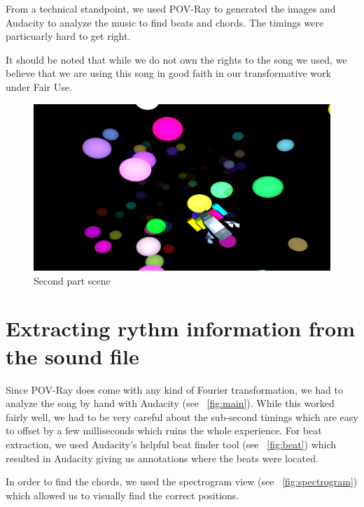 \documentclass[a4paper, 12pt]{scrartcl}
\begin{document}
    From a technical standpoint, we used POV-Ray to generated the images and Audacity to analyze
    the music to find beats and chords. The timings were particuarly hard to get right.

    It should be noted that while we do not own the rights to the song we used, we believe that we
    are using this song in good faith in our transformative work under Fair Use.

    \begin{figure}[H]
        \centering
        \includegraphics[scale=0.23]{render_part2}
        \caption{Second part scene}
        \label{fig:part2}
    \end{figure}

    \section{Extracting rythm information from the sound file}

    Since POV-Ray does come with any kind of Fourier transformation, we had to analyze the song by
    hand with Audacity (see ~\ref{fig:main}). While this worked fairly well, we had to be very
    careful about the sub-second timings which are easy to offset by a few milliseconds which ruins
    the whole experience. For beat extraction, we used Audacity's helpful beat finder tool (see
    ~\ref{fig:beat}) which resulted in Audacity giving us annotations where the beats were located.

    In order to find the chords, we used the spectrogram view (see ~\ref{fig:spectrogram}) which
    allowed us to visually find the correct positions.
\end{document}

